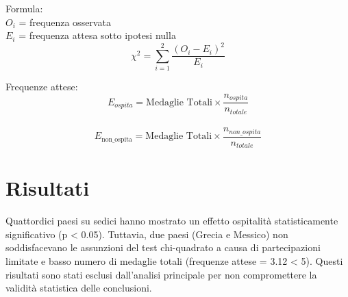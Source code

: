 \documentclass{article}
\begin{document}
Formula:\\
$O_i$ = frequenza osservata\\
$E_i$ = frequenza attesa sotto ipotesi nulla
$$\chi^2= \sum_{i=1}^{2} \frac{(O_i - E_i)^2}{E_i}$$

Frequenze attese:
$$E_{ospita}=\text{Medaglie Totali} \times \frac{n_{ospita}}{n_{totale}}$$\\
$$E_{\text {non\_ospita}}=\text{Medaglie Totali} \times \frac{n_{non\_ospita}}
{n_{totale}}$$

\section{Risultati}
Quattordici paesi su sedici hanno mostrato un effetto ospitalità statisticamente 
significativo (p < 0.05). Tuttavia, due paesi (Grecia e Messico) non soddisfacevano 
le assunzioni del test chi-quadrato a causa di partecipazioni limitate e basso 
numero di medaglie totali (frequenze attese = 3.12 < 5). Questi risultati sono 
stati esclusi dall'analisi principale per non compromettere la validità statistica 
delle conclusioni.

\end{document}
